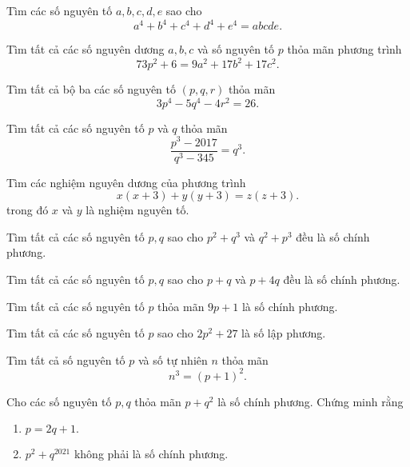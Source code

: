 \begin{btt}
Tìm các số nguyên tố $a,b,c,d,e$ sao cho \[a^4+b^4+c^4+d^4+e^4=abcde.\]
\end{btt}

\begin{btt}
Tìm tất cả các số nguyên dương \(a,b,c\) và số nguyên tố \(p\) thỏa mãn phương trình
\[73 p^{2}+6=9 a^{2}+17 b^{2}+17 c^{2}.\]
\end{btt}

\begin{btt}
Tìm tất cả bộ ba các số nguyên tố $(p,q,r)$ thỏa mãn \[3p^4-5q^4-4r^2=26.\]
\end{btt}

\begin{btt}
Tìm tất cả các số nguyên tố $p$ và $q$ thỏa mãn 
$$\dfrac{p^{3}-2017}{q^{3}-345}=q^{3}.$$
\end{btt}

\begin{btt}
Tìm các nghiệm nguyên dương của phương trình 
$$x(x+3)+y(y+3)=z(z+3).$$ trong đó $x$ và $y$ là nghiệm nguyên tố.
\end{btt}

\begin{btt}
Tìm tất cả các số nguyên tố $p,q$ sao cho $p^2+q^3$ và $q^2+p^3$ đều là số chính phương.
\end{btt}

\begin{btt}
Tìm tất cả các số nguyên tố $p,q$ sao cho $p+q$ và $p+4q$ đều là số chính phương.
\end{btt}


\begin{btt}
Tìm tất cả các số nguyên tố $p$ thỏa mãn $9p+1$ là số chính phương.
\end{btt}

\begin{btt}
Tìm tất cả các số nguyên tố $p$ sao cho $2p^2+27$ là số lập phương.
\end{btt}

\begin{btt}
Tìm tất cả số nguyên tố $p$ và số tự nhiên $n$ thỏa mãn \[n^3=(p+1)^2.\]
\end{btt}

\begin{btt}
Cho các số nguyên tố $p,q$ thỏa mãn $p+q^2$ là số chính phương. Chứng minh rằng
\begin{enumerate}[a,]
    \item $p=2q+1.$
    \item $p^2+q^{2021}$ không phải là số chính phương.
\end{enumerate}
\end{btt}

